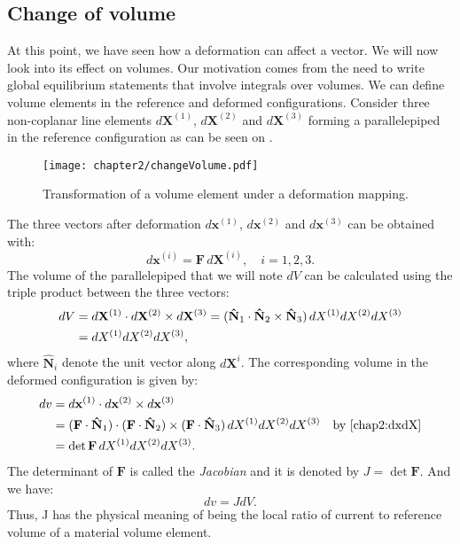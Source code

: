 	\subsection{Change of volume}
At this point, we have seen how a deformation can affect a vector. We will now look into its effect on volumes. Our motivation comes from the need to write global equilibrium statements that involve integrals over volumes. We can define volume elements in the reference and deformed configurations. Consider three non-coplanar line elements $d\mathbf{X}^{(1)}$, $d\mathbf{X}^{(2)}$ and $d\mathbf{X}^{(3)}$ forming a parallelepiped in the reference configuration as can be seen on . 
% 
\begin{figure}[h]
\begin{center}
\texttt{[image: chapter2/changeVolume.pdf]}
\end{center}
\caption{Transformation of a volume element under a deformation mapping. }
\label{chap2:fig-changeVolume}
\end{figure}
%

The three vectors after deformation $d\mathbf{x}^{(1)}$, $d\mathbf{x}^{(2)}$ and $d\mathbf{x}^{(3)}$ can be obtained with:
\begin{equation}
\label{chap2:dxdX}
d\mathbf{x}^{(i)} = \mathbf{F} \, d\mathbf{X}^{(i)}, \quad i = 1, 2, 3.
\end{equation}
The volume of the parallelepiped that we will note $dV$  can be calculated using the triple product between the three vectors:
\begin{align}
dV &= d\mathbf{X}^{(1)} \cdot d\mathbf{X}^{(2)} \times d\mathbf{X}^{(3)} = (\mathbf{\hat{N}}_{1} \cdot \mathbf{\hat{N}}_{2} \times \mathbf{\hat{N}}_{3}) \, dX^{(1)} dX^{(2)} dX^{(3)} \notag \\
&= dX^{(1)} dX^{(2)} dX^{(3)}, \label{chap2:dV}
\end{align}
where $\mathbf{\hat{N}}_{i}$ denote the unit vector along $d\mathbf{X}^{i}$. The corresponding volume in the deformed configuration is given by:
\begin{align}
dv &= d\mathbf{x}^{(1)} \cdot d\mathbf{x}^{(2)} \times d\mathbf{x}^{(3)} \notag \\
&=  (\mathbf{F} \cdot \mathbf{\hat{N}}_{1}) \cdot (\mathbf{F} \cdot \mathbf{\hat{N}}_{2}) \times (\mathbf{F} \cdot \mathbf{\hat{N}}_{3}) \,  dX^{(1)} dX^{(2)} dX^{(3)} \quad \text{by \eqref{chap2:dxdX}} \notag \\
&= \det \mathbf{F} \, dX^{(1)} dX^{(2)} dX^{(3)}. \label{chap2:dv}
\end{align}
The determinant of $\mathbf{F}$ is called the \emph{Jacobian} and it is denoted by $J = \det \mathbf{F}$. And we have:
\begin{equation}
\label{chap2:dvdV}
dv = J dV.
\end{equation}
Thus, J has the physical meaning of being the local ratio of current to reference volume of a material volume element.


